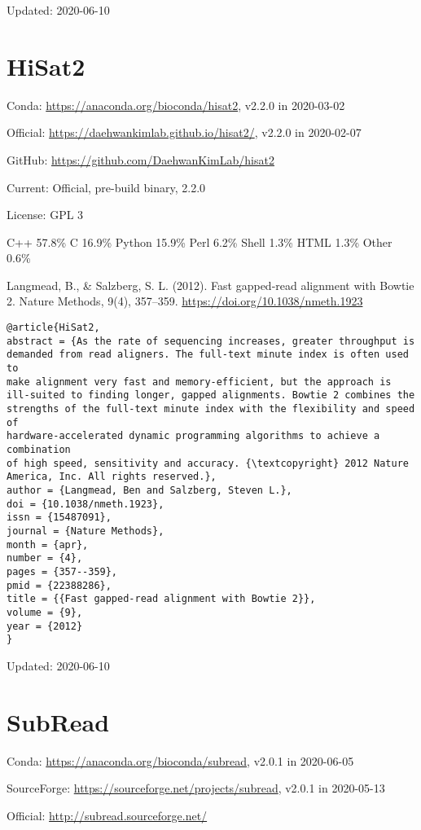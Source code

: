 \documentclass[]{article}
\begin{document}
Updated: 2020-06-10
\section{HiSat2}

Conda: \url{https://anaconda.org/bioconda/hisat2}, v2.2.0 in 2020-03-02

Official: \url{https://daehwankimlab.github.io/hisat2/}, v2.2.0 in 2020-02-07

GitHub: \url{https://github.com/DaehwanKimLab/hisat2}

Current: Official, pre-build binary, 2.2.0

License: GPL 3

C++ 57.8\% C 16.9\% Python 15.9\% Perl 6.2\% Shell 1.3\% HTML 1.3\% Other 0.6\%

Langmead, B., \& Salzberg, S. L. (2012). Fast gapped-read alignment with Bowtie 2. Nature Methods, 9(4), 357–359. \url{https://doi.org/10.1038/nmeth.1923}

\begin{verbatim}
@article{HiSat2,
abstract = {As the rate of sequencing increases, greater throughput is
demanded from read aligners. The full-text minute index is often used to
make alignment very fast and memory-efficient, but the approach is
ill-suited to finding longer, gapped alignments. Bowtie 2 combines the
strengths of the full-text minute index with the flexibility and speed of
hardware-accelerated dynamic programming algorithms to achieve a combination
of high speed, sensitivity and accuracy. {\textcopyright} 2012 Nature
America, Inc. All rights reserved.},
author = {Langmead, Ben and Salzberg, Steven L.},
doi = {10.1038/nmeth.1923},
issn = {15487091},
journal = {Nature Methods},
month = {apr},
number = {4},
pages = {357--359},
pmid = {22388286},
title = {{Fast gapped-read alignment with Bowtie 2}},
volume = {9},
year = {2012}
}
\end{verbatim}

Updated: 2020-06-10


\section{SubRead}

Conda: \url{https://anaconda.org/bioconda/subread}, v2.0.1 in 2020-06-05

SourceForge: \url{https://sourceforge.net/projects/subread}, v2.0.1 in 2020-05-13

Official: \url{http://subread.sourceforge.net/}
\end{document}

